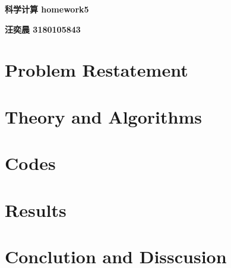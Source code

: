 \documentclass[12pt]{article}
\begin{document}
\pagestyle{fancy}
\setcounter{page}{1}
\vspace{20pt}
\centerline{{\Large \textbf{科学计算 homework5}}}
\vspace{15pt}

\centerline{{\large \textbf{汪奕晨 3180105843}}}
\vspace{15pt}

\section{Problem Restatement}

\section{Theory and Algorithms}

\section{Codes}

\section{Results}

\section{Conclution and Disscusion}
\end{document}
